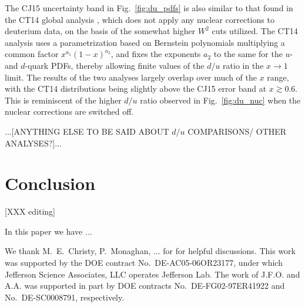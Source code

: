 \documentclass[aps,prd,amsmath,preprint]{revtex4}
\begin{document}
The CJ15 uncertainty band in Fig.~\ref{fig:du_pdfs} is also similar
to that found in the CT14 global analysis \cite{CT14}, which does not
apply any nuclear corrections to deuterium data, on the basis of the
somewhat higher $W^2$ cuts utilized.  The CT14 analysis uses a
parametrization based on Bernstein polynomials multiplying a
common factor $x^{a_1} (1-x)^{a_2}$, and fixes the exponents $a_2$
to the same for the $u$- and $d$-quark PDFs, thereby allowing
finite values of the $d/u$ ratio in the $x \to 1$ limit.
The results of the two analyses largely overlap over much of the
$x$ range, with the CT14 distributions being slightly above the
CJ15 error band at $x \gtrsim 0.6$.  This is reminiscent of the
higher $d/u$ ratio observed in Fig.~\ref{fig:du_nuc} when the
nuclear corrections are switched off.


{\color{red} ...[ANYTHING ELSE TO BE SAID ABOUT $d/u$ COMPARISONS/
OTHER ANALYSES?]...}


\section{Conclusion} {\color{red} [XXX editing]}
\label{sec:conclusion}

In this paper we have ...




\newpage
\acknowledgments

We thank M.~E.~Christy, P.~Monaghan, ... for for helpful discussions.
This work was supported by the DOE contract No.~DE-AC05-06OR23177,
under which Jefferson Science Associates, LLC operates Jefferson Lab.
The work of J.F.O. and A.A. was supported in part by DOE contracts
No.~DE-FG02-97ER41922 and No.~DE-SC0008791, respectively.
\end{document}
